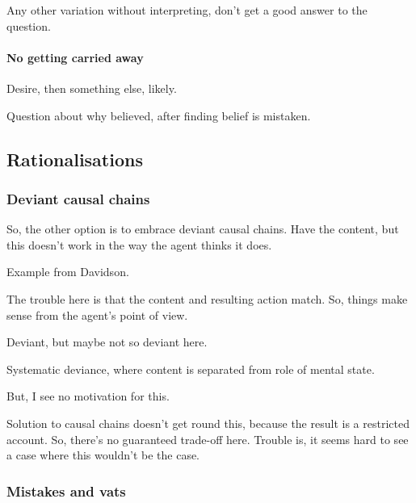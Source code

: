 \begin{note}
  Any other variation without interpreting, don't get a good answer to the question.
\end{note}

\paragraph{No getting carried away}

\begin{note}
  Desire, then something else, likely.
\end{note}

\begin{note}
  Question about why believed, after finding belief is mistaken.
\end{note}

\subsection{Rationalisations}
\label{sec:rationalisations}


\subsubsection{Deviant causal chains}
\label{sec:devi-caus-chains}

\begin{note}
  So, the other option is to embrace deviant causal chains.
  Have the content, but this doesn't work in the way the agent thinks it does.

  Example from Davidson.

  The trouble here is that the content and resulting action match.
  So, things make sense from the agent's point of view.

  Deviant, but maybe not so deviant here.

  Systematic deviance, where content is separated from role of mental state.

  But, I see no motivation for this.

  Solution to causal chains doesn't get round this, because the result is a restricted account.
  So, there's no guaranteed trade-off here.
  Trouble is, it seems hard to see a case where this wouldn't be the case.
\end{note}

\subsubsection{Mistakes and vats}

